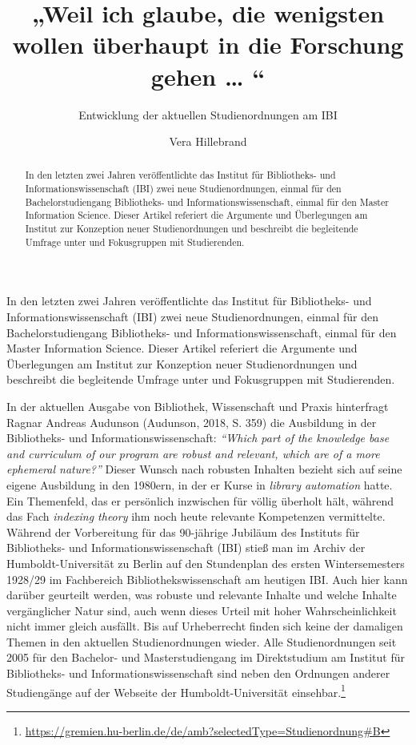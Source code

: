 \documentclass[a4paper,
fontsize=11pt,
oneside,
numbers=noperiodatend,
parskip=half-,
bibliography=totoc,
final
]{scrartcl}
\title{\LARGE{„Weil ich glaube, die wenigsten wollen überhaupt in die Forschung gehen … “}}%
\subtitle{Entwicklung der aktuellen Studienordnungen am IBI}
\author{Vera Hillebrand} %
\date{}
\begin{document}
\maketitle
\thispagestyle{fancyplain} 

\begin{abstract}
In den letzten zwei Jahren veröffentlichte das Institut für Bibliotheks-
und Informationswissenschaft (IBI) zwei neue Studienordnungen, einmal
für den Bachelorstudiengang Bibliotheks- und Informationswissenschaft,
einmal für den Master Information Science. Dieser Artikel referiert die
Argumente und Überlegungen am Institut zur Konzeption neuer
Studienordnungen und beschreibt die begleitende Umfrage unter und
Fokusgruppen mit Studierenden.
\end{abstract}

In den letzten zwei Jahren veröffentlichte das Institut für Bibliotheks-
und Informationswissenschaft (IBI) zwei neue Studienordnungen, einmal
für den Bachelorstudiengang Bibliotheks- und Informationswissenschaft,
einmal für den Master Information Science. Dieser Artikel referiert die
Argumente und Überlegungen am Institut zur Konzeption neuer
Studienordnungen und beschreibt die begleitende Umfrage unter und
Fokusgruppen mit Studierenden.

In der aktuellen Ausgabe von Bibliothek, Wissenschaft und Praxis
hinterfragt Ragnar Andreas Audunson (Audunson, 2018, S. 359) die
Ausbildung in der Bibliotheks- und Informationswissenschaft:
\emph{\enquote{Which part of the knowledge base and curriculum of our
program are robust and relevant, which are of a more ephemeral nature?}}
Dieser Wunsch nach robusten Inhalten bezieht sich auf seine eigene
Ausbildung in den 1980ern, in der er Kurse in \emph{library automation}
hatte. Ein Themenfeld, das er persönlich inzwischen für völlig überholt
hält, während das Fach \emph{indexing theory} ihm noch heute relevante
Kompetenzen vermittelte. Während der Vorbereitung für das 90-jährige
Jubiläum des Instituts für Bibliotheks- und Informationswissenschaft
(IBI) stieß man im Archiv der Humboldt-Universität zu Berlin auf den
Stundenplan des ersten Wintersemesters 1928/29 im Fachbereich
Bibliothekswissenschaft am heutigen IBI. Auch hier kann darüber
geurteilt werden, was robuste und relevante Inhalte und welche Inhalte
vergänglicher Natur sind, auch wenn dieses Urteil mit hoher
Wahrscheinlichkeit nicht immer gleich ausfällt. Bis auf Urheberrecht
finden sich keine der damaligen Themen in den aktuellen Studienordnungen
wieder. Alle Studienordnungen seit 2005 für den Bachelor- und
Masterstudiengang im Direktstudium am Institut für Bibliotheks- und
Informationswissenschaft sind neben den Ordnungen anderer Studiengänge
auf der Webseite der Humboldt-Universität einsehbar.\footnote{\url{https://gremien.hu-berlin.de/de/amb?selectedType=Studienordnung\#B}}
\end{document}
